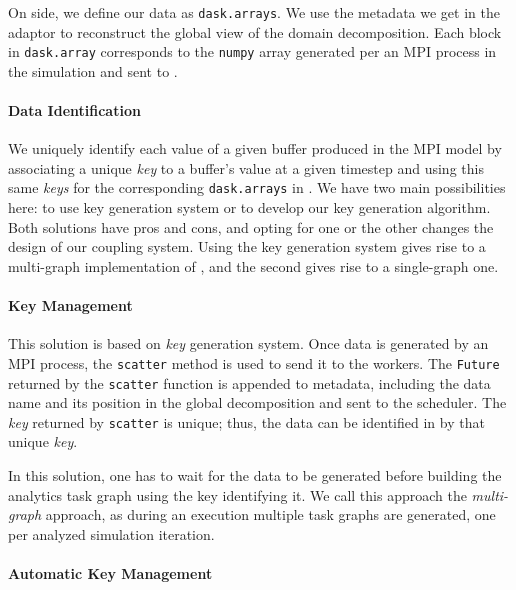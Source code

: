 On \dask side, we define our data as \texttt{dask.arrays}. We use the metadata we get in the adaptor to reconstruct the global view of the domain decomposition. Each block in \texttt{dask.array} corresponds to the \texttt{numpy} array generated per an MPI process in the simulation and sent to \dask. 

\paragraph{Data Identification}\label{sec:datamodel:dataid}

We uniquely identify each value of a given buffer produced in the MPI model by associating a unique \textit{key} to a buffer's value at a given timestep and using this same \textit{keys} for the corresponding \texttt{dask.arrays} in \dask. We have two main possibilities here: to use \dask key generation system or to develop our key generation algorithm. 
Both solutions have pros and cons, and opting for one or the other changes the design of our coupling system. Using the \dask key generation system gives rise to a multi-graph implementation of \deisa, and the second gives rise to a single-graph one. 


\paragraph*{\dask Key Management}\label{sec:synchimplementation}

This solution is based on \dask \textit{key} generation system.
Once data is generated by an MPI process, the \texttt{scatter} method is used to send it to the \dask workers.
The \texttt{Future} returned by the \texttt{scatter} function is appended to metadata, including the data name and its position in the global decomposition  and sent to the scheduler. The \textit{key} returned by \texttt{scatter} is unique; thus, the data can be identified in \dask by that unique \textit{key}. 

In this solution, one has to wait for the data to be generated before building the analytics task graph using the key identifying it. We call this approach the \textit{multi-graph} approach, as during an execution multiple task graphs are generated, one per analyzed simulation iteration.

\paragraph*{Automatic Key Management}\label{sec:asynchimplementation}

